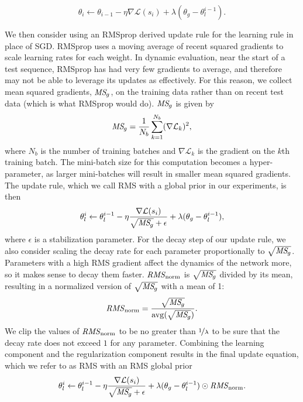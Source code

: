 \documentclass{article} %
\newcommand{\rmsnorm}{\mathit{RMS}_\mathrm{\kern-0.5pt norm}}
\newcommand{\MSg}{\mathit{MS}_{\kern-1.2pt g}}
\begin{document}
\begin{equation}
\theta_i \leftarrow \theta_{i-1} - \eta \nabla \mathcal{L}(s_i) + \lambda (\theta_g - \theta^{i-1}_l).
\end{equation}



We then consider using an RMSprop \citep{tieleman2012} derived update rule for the learning rule in place of SGD\@. RMSprop uses a moving average of recent squared gradients to scale learning rates for each weight. In dynamic evaluation, near the start of a test sequence, RMSprop has had very few gradients to average, and therefore may not be able to leverage its updates as effectively. For this reason, we collect mean squared gradients, $\MSg$, on the training data rather than on recent test data (which is what RMSprop would do). $\MSg$ is given by
\begin{equation}
\MSg =  \frac{1}{N_b}\sum_{k=1}^{N_b}(\nabla \mathcal{L}_k)^2,
\end{equation}
where $N_b$ is the number of training batches and $\nabla \mathcal{L}_k$ is the gradient on the $k$th training batch. The mini-batch size for this computation becomes a hyper-parameter, as larger mini-batches will result in smaller mean squared gradients. The update rule, which we call RMS with a global prior in our experiments, is then
\begin{equation}
\theta^i_l \leftarrow \theta^{i-1}_l - \eta \frac{\nabla \mathcal{L}(s_i)}{\sqrt{\MSg}+\epsilon} + \lambda (\theta_g - \theta^{i-1}_l) ,
\end{equation}
where $\epsilon$ is a stabilization parameter. For the decay step of our update rule, we also consider scaling the decay rate for each parameter proportionally to $\sqrt{\MSg}$. Parameters with a high RMS gradient affect the dynamics of the network more, so it makes sense to decay them faster. $\rmsnorm$ is $\sqrt{\MSg}$ divided by its mean, resulting in a normalized version of $\sqrt{\MSg}$ with a mean of 1:
\begin{equation}
    \rmsnorm = \frac{\sqrt{\MSg}}{\mathrm{avg}(\sqrt{\MSg})}.
\end{equation}
We clip the values of $\rmsnorm$ to be no greater than $\nicefrac{1}{\lambda}$ to be sure that the decay rate does not exceed $1$ for any parameter. Combining the learning component and the regularization component results in the final update equation, which we refer to as RMS with an RMS global prior
\begin{equation}
\theta^i_l \leftarrow \theta^{i-1}_l - \eta \frac{\nabla \mathcal{L}(s_i)}{\sqrt{\MSg}+\epsilon} + \lambda (\theta_g - \theta^{i-1}_l) \odot \rmsnorm .
\end{equation}
\end{document}
